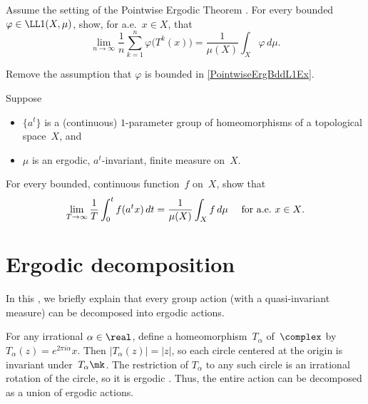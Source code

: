 \begin{exercises}
\item \label{PointwiseErgBddL1Ex}
Assume the setting of the Pointwise Ergodic Theorem . 
For every bounded $\varphi \in \LL1(X,\mu)$, show, for a.e.\ $x \in X$, that 
	$$ \lim_{n \to \infty} \frac{1}{n} \sum_{k=1}^n \varphi \bigl( T^k(x) \bigr) 
	= \frac{1}{\mu(X)} \int_X \varphi \, d\mu .$$

\item \harder 
Remove the assumption that $\varphi$ is bounded in \cref{PointwiseErgBddL1Ex}.

\item \label{PointwiseErgThmForREx}
Suppose 
	\begin{itemize}
	\item $\{a^t\}$ is a (continuous) $1$-parameter group of homeomorphisms of a topological space~$X$,
and
	\item $\mu$ is an ergodic, $a^t$-invariant, finite measure on~$X$.
	\end{itemize}
For every bounded, continuous function~$f$ on~$X$, show that
	$$ \text{$\displaystyle \lim_{T \to \infty} \frac{1}{T} \int_0^t f(a^t x) \, dt = \frac{1}{\mu(X)} \int_X f\, d\mu$ \quad  for a.e.~$x \in X$} .$$

\end{exercises}






\section{Ergodic decomposition} \label{ErgDecompSect}

In this , we briefly explain that every group action (with a quasi-invariant measure) can be decomposed into ergodic actions.

\begin{eg}
For any irrational $\alpha \in \real$, define a homeomorphism~$T_\alpha$ of~$\complex$ by
	$ T_\alpha(z) = e^{2\pi i \alpha} x $.
Then $|T_\alpha(z)| = |z|$, so each circle centered at the origin is invariant under~$T_\alpha\mk$. The restriction of $T_\alpha$ to any such circle is an irrational rotation of the circle, so it is ergodic . Thus, the entire action can be decomposed as a union of ergodic actions. 
\end{eg}

